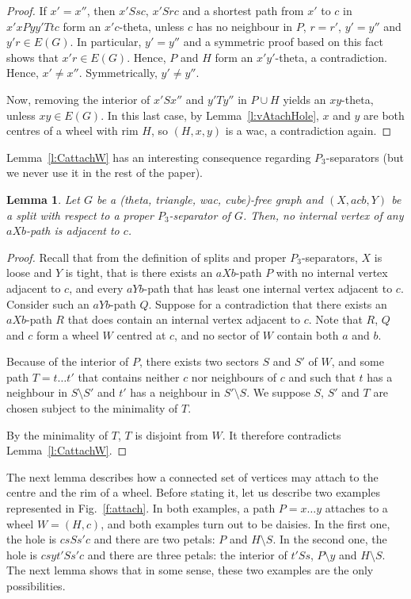 \documentclass[11pt]{article}
\newtheorem{lemma}[theo]{Lemma}
\newcommand{\sm}{\setminus}
\begin{document}
\begin{proof}
  If $x'=x''$, then $x' S s c$, $x' S r c$ and a shortest path from  $x'$ to $c$ in $x' x P y y' T t c$ form an $x'c$-theta, unless $c$ has no neighbour in $P$,  $r=r'$, $y'=y''$ and $y'r\in E(G)$.  
  In particular, $y'=y''$ and a symmetric
  proof based on this fact shows that $x'r\in E(G)$.  Hence, $P$ and
  $H$ form an $x'y'$-theta, a contradiction. 
  Hence, $x'\neq x''$.  Symmetrically, $y'\neq y''$.

  Now, removing the interior of $x' S x''$ and $y' T y''$  in $P\cup H$ yields an $xy$-theta, unless $xy\in E(G)$.  
  In this last case, by Lemma~\ref{l:vAtachHole}, $x$ and $y$ are both centres of a wheel with rim $H$, so $(H, x, y)$ is a wac, a contradiction again. 
\end{proof}


Lemma~\ref{l:CattachW} has an interesting consequence regarding
$P_3$-separators (but we never use it in the rest of the paper).

\begin{lemma}
  \label{l:looseSide}
  Let $G$ be a (theta, triangle, wac, cube)-free graph and $(X, acb, Y)$ be a split with respect to a proper $P_3$-separator of $G$. 
  Then, no internal vertex of any $aXb$-path is adjacent to $c$.
\end{lemma}


\begin{proof}
  Recall that from the definition of splits and proper
  $P_3$-separators, $X$ is loose and $Y$ is tight, that is there exists an $aXb$-path $P$  with  no  internal vertex adjacent to $c$, and every
  $aYb$-path that has least one internal vertex adjacent to $c$.  Consider such an $aYb$-path $Q$.  Suppose for a contradiction that there exists an $aXb$-path $R$  that does contain an internal vertex adjacent to $c$.  Note that $R$, $Q$ and $c$ form a wheel $W$ centred at $c$, and no sector of $W$ contain both $a$ and $b$.

  Because of the interior of $P$, there exists two sectors $S$
  and $S'$ of $W$, and some path $T = t\dots t'$ that contains neither $c$ nor neighbours of $c$ and such that $t$ has a neighbour in $S\sm S'$ and $t'$ has a neighbour in $S'\sm S$.  We suppose $S$, $S'$ and $T$ are chosen subject to the minimality of $T$.

  By the minimality of $T$, $T$ is disjoint from $W$.  It therefore contradicts Lemma~\ref{l:CattachW}. 
\end{proof}

The next lemma describes how a connected set of vertices may attach to the centre and the rim of a wheel.  
Before stating it, let us describe two examples represented in Fig.~\ref{f:attach}.  
In both examples, a path $P = x \dots y$ attaches to a wheel $W = (H, c)$, and both examples turn out to be daisies. In the first one, the hole is $c s S s' c$ and there are two petals: $P$ and $H\sm S$.  
In the second one, the hole is $c s y t' S s' c$ and there are three petals: the interior of $t' S s$, $P\sm y$ and $H \sm S$.
The next lemma shows that in some sense, these two examples are the only possibilities.
\end{document}
